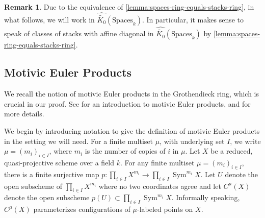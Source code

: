 \documentclass[12 pt]{amsart}
\newcommand{\rboxed}[1]{#1}
\theoremstyle{plain}
\theoremstyle{definition}
\newtheorem{remark}[theorem]{Remark}
\theoremstyle{remark}
\numberwithin{equation}{section}
\newcommand\bp{\mathbb P}
\DeclareMathOperator\spec{\operatorname{Spec}}
\newcommand\grcSpaces{\widehat{\widetilde{K_0}}(\mathrm{Spaces}_k)} %
\DeclareMathOperator\sym{Sym}
\begin{document}
\begin{remark}
	\label{remark:}
	Due to the equivalence of \autoref{lemma:spaces-ring-equals-stacks-ring}, in
	what follows, we will work in $\grcSpaces$.
	In particular, it makes sense to speak of classes of stacks with affine
	diagonal in
$\grcSpaces$ by \autoref{lemma:spaces-ring-equals-stacks-ring}.
\end{remark}

\subsection{Motivic Euler Products} \label{subsection:motivic-euler-products}

We recall the notion of motivic Euler products in the Grothendieck ring, which
is crucial in our proof.  
See \cite{bilu:thesis} for an introduction to motivic Euler products,
and \cite[\S6]{biluH:motivic-euler-products-in-motivic-statistics} for more details.

We begin by introducing notation to
give the definition of motivic Euler products in the setting we will need.  
For a finite multiset $\mu$, with underlying set $I$, we write $\mu=(m_i)_{i \in I}$, where $m_i$ is the number of copies of $i$ in $\mu$. 
Let $X$ be a reduced, quasi-projective 
scheme over a field $k$.  
For any finite multiset $\mu =
(m_i)_{i \in I}$, there is a  finite surjective map $p: \prod_{i \in I} X^{m_i}
\to \prod_{i \in I} \sym^{m_i} X$.  Let $U$ denote the open subscheme 
of $\prod_{i \in I} X^{m_i}$
where
no two coordinates agree and let $\rboxed{C^\mu(X)}$ denote the open
subscheme $p(U) \subset \prod_{i \in I} \sym^{m_i} X$.  Informally speaking,
$C^\mu(X)$ parameterizes configurations of $\mu$-labeled points on $X$.
\end{document}
